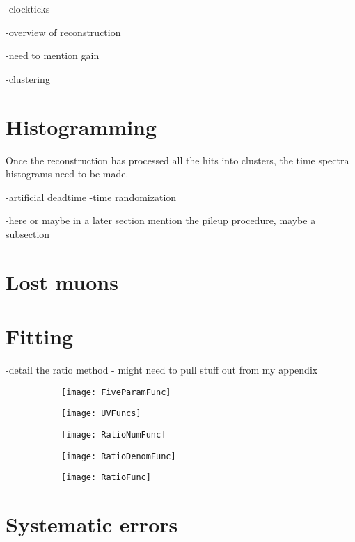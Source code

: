 -clockticks






-overview of reconstruction

-need to mention gain


-clustering




\section{Histogramming}
\label{sec:Histogramming}


Once the reconstruction has processed all the hits into clusters, the time spectra histograms need to be made.



-artificial deadtime
-time randomization

-here or maybe in a later section mention the pileup procedure, maybe a subsection


\section{Lost muons}
\label{sec:lostmuons}

\section{Fitting}
\label{sec:Fitting}


-detail the ratio method - might need to pull stuff out from my appendix


    \begin{figure}[]
    \centering
        \begin{subfigure}[t]{0.45\textwidth}
            \centering
            \texttt{[image: FiveParamFunc]}
            \caption{}
        \end{subfigure}%

        \vspace{2mm}
        \begin{subfigure}[t]{0.45\textwidth}
            \centering
            \texttt{[image: UVFuncs]}
            \caption{}
        \end{subfigure}
        \begin{subfigure}[t]{0.45\textwidth}
            \centering
            \texttt{[image: RatioNumFunc]}
            \caption{}
        \end{subfigure}%
        \vspace{2mm}
        \begin{subfigure}[t]{0.45\textwidth}
            \centering
            \texttt{[image: RatioDenomFunc]}
            \caption{}
        \end{subfigure}
        \begin{subfigure}[t]{0.45\textwidth}
            \centering
            \texttt{[image: RatioFunc]}
            \caption{}
        \end{subfigure}%
    \caption[]{}
    \label{}
    \end{figure}






\section{Systematic errors}
\label{sec:Systematic Errors}



\cleardoublepage
